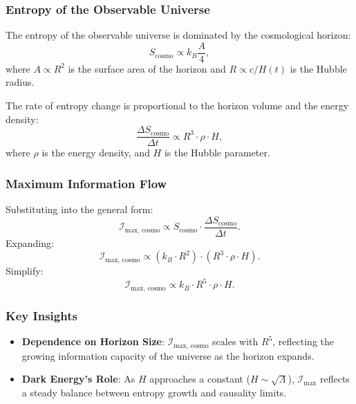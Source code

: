 \documentclass[12pt]{article}
\begin{document}
\subsubsection{Entropy of the Observable Universe}
The entropy of the observable universe is dominated by the cosmological horizon:
\[
S_{\text{cosmo}} \propto k_B \frac{A}{4},
\]
where \( A \propto R^2 \) is the surface area of the horizon and \( R \propto c / H(t) \) is the Hubble radius.

The rate of entropy change is proportional to the horizon volume and the energy density:
\[
\frac{\Delta S_{\text{cosmo}}}{\Delta t} \propto R^3 \cdot \rho \cdot H,
\]
where \( \rho \) is the energy density, and \( H \) is the Hubble parameter.

\subsubsection{Maximum Information Flow}
Substituting into the general form:
\[
\mathcal{I}_{\text{max, cosmo}} \propto S_{\text{cosmo}} \cdot \frac{\Delta S_{\text{cosmo}}}{\Delta t}.
\]
Expanding:
\[
\mathcal{I}_{\text{max, cosmo}} \propto \left(k_B \cdot R^2\right) \cdot \left(R^3 \cdot \rho \cdot H\right).
\]
Simplify:
\[
\mathcal{I}_{\text{max, cosmo}} \propto k_B \cdot R^5 \cdot \rho \cdot H.
\]

\subsubsection{Key Insights}
\begin{itemize}
    \item \textbf{Dependence on Horizon Size}: \( \mathcal{I}_{\text{max, cosmo}} \) scales with \( R^5 \), reflecting the growing information capacity of the universe as the horizon expands.
    \item \textbf{Dark Energy’s Role}: As \( H \) approaches a constant (\( H \sim \sqrt{\Lambda} \)), \( \mathcal{I}_{\text{max}} \) reflects a steady balance between entropy growth and causality limits.
\end{itemize}

\end{document}
